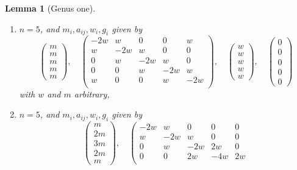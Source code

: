 \documentclass{stacks-project}
\theoremstyle{plain}
\newtheorem{lemma}[subsection]{Lemma}
\theoremstyle{definition}
\theoremstyle{remark}
\numberwithin{equation}{subsection}
\begin{document}
\begin{lemma}[Genus one]
\begin{enumerate}
$$\begin{matrix}
w
\end{matrix}
\right),
\quad
\left(
\begin{matrix}
0 \\
0 \\
0 \\
0
\end{matrix}
\right)
$$
with $w$ and $m$ arbitrary,
\item
\label{item-five-cycle}
$n = 5$, and $m_i, a_{ij}, w_i, g_i$ given by
$$
\left(
\begin{matrix}
m \\
m \\
m \\
m \\
m
\end{matrix}
\right),
\quad
\left(
\begin{matrix}
-2w & w & 0 & 0 & w \\
w & -2w & w & 0 & 0 \\
0 & w & -2w & w & 0 \\
0 & 0 & w & -2w & w \\
w & 0 & 0 & w & -2w \\
\end{matrix}
\right),
\quad
\left(
\begin{matrix}
w \\
w \\
w \\
w \\
w
\end{matrix}
\right),
\quad
\left(
\begin{matrix}
0 \\
0 \\
0 \\
0 \\
0
\end{matrix}
\right)
$$
with $w$ and $m$ arbitrary,
\item
\label{item-equal-equal-up-equal}
$n = 5$, and $m_i, a_{ij}, w_i, g_i$ given by
$$
\left(
\begin{matrix}
m \\
2m \\
3m \\
2m \\
m
\end{matrix}
\right),
\quad
\left(
\begin{matrix}
-2w & w & 0 & 0 & 0 \\
w & -2w & w & 0 & 0 \\
0 & w & -2w & 2w & 0 \\
0 & 0 & 2w & -4w & 2w \\

\end{matrix}$$
\end{enumerate}
\end{lemma}
\end{document}
